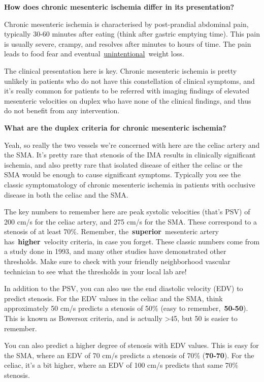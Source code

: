 \documentclass[
]{book}
\begin{document}
\textbf{How does chronic mesenteric ischemia differ in its presentation?}

Chronic mesenteric ischemia is characterised by post-prandial abdominal
pain, typically 30-60 minutes after eating (think after gastric emptying
time). This pain is usually severe, crampy, and resolves after minutes
to hours of time. The pain leads to food fear and
eventual~\underline{unintentional}~weight loss.

The clinical presentation here is key. Chronic mesenteric ischemia is
pretty unlikely in patients who do not have this constellation of
clinical symptoms, and it's really common for patients to be referred
with imaging findings of elevated mesenteric velocities on duplex who
have none of the clinical findings, and thus do not benefit from any
intervention.

\textbf{What are the duplex criteria for chronic mesenteric ischemia?}

Yeah, so really the two vessels we're concerned with here are the celiac
artery and the SMA. It's pretty rare that stenosis of the IMA results in
clinically significant ischemia, and also pretty rare that isolated
disease of either the celiac or the SMA would be enough to cause
significant symptoms. Typically you see the classic symptomatology of
chronic mesenteric ischemia in patients with occlusive disease in both
the celiac and the SMA.

The key numbers to remember here are peak systolic velocities (that's
PSV) of 200 cm/s for the celiac artery, and 275 cm/s for the SMA. These
correspond to a stenosis of at least 70\%. Remember,
the~\textbf{superior}~mesenteric artery has~\textbf{higher}~velocity criteria, in
case you forget. These classic numbers come from a study done in 1993,
and many other studies have demonstrated other thresholds. Make sure to
check with your friendly neighborhood vascular technician to see what
the thresholds in your local lab are!

In addition to the PSV, you can also use the end diastolic velocity
(EDV) to predict stenosis. For the EDV values in the celiac and the SMA,
think approximately 50 cm/s predicts a stenosis of 50\% (easy to
remember,~\textbf{50-50}). This is known as Bowersox criteria, and is
actually \textgreater45, but 50 is easier to
remember.\citep{bowersoxDuplexUltrasonographyDiagnosis1991}

You can also predict a higher degree of stenosis with EDV values. This
is easy for the SMA, where an EDV of 70 cm/s predicts a stenosis of 70\%
(\textbf{70-70}). For the celiac, it's a bit higher, where an EDV of 100 cm/s
predicts that same 70\% stenosis.
\end{document}

